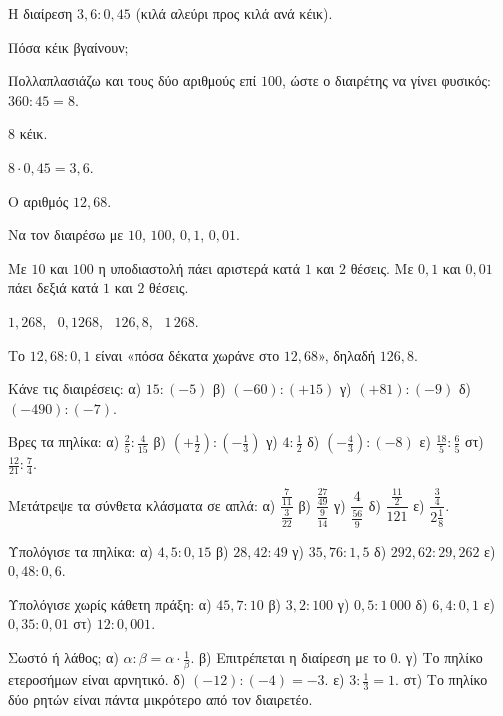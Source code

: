 \tixero Η διαίρεση $3{,}6:0{,}45$ (κιλά αλεύρι προς κιλά ανά κέικ).\par
\tithelo Πόσα κέικ βγαίνουν;\par
\possindeo Πολλαπλασιάζω και τους δύο αριθμούς επί $100$, ώστε ο διαιρέτης να γίνει φυσικός: $360:45=8$.\par
\apantisi $8$ κέικ.\par
\elegxos $8\cdot0{,}45=3{,}6$.

\tixero Ο αριθμός $12{,}68$.\par
\tithelo Να τον διαιρέσω με $10$, $100$, $0{,}1$, $0{,}01$.\par
\possindeo Με $10$ και $100$ η υποδιαστολή πάει αριστερά κατά $1$ και $2$ θέσεις. Με $0{,}1$ και $0{,}01$ πάει δεξιά κατά $1$ και $2$ θέσεις.\par
\apantisi $1{,}268$, \ $0{,}1268$, \ $126{,}8$, \ $1\,268$.\par
\elegxos Το $12{,}68:0{,}1$ είναι «πόσα δέκατα χωράνε στο $12{,}68$», δηλαδή $126{,}8$.



\ex Κάνε τις διαιρέσεις: α) $15:(-5)$ \quad β) $(-60):(+15)$ \quad γ) $(+81):(-9)$ \quad δ) $(-490):(-7)$.

\ex Βρες τα πηλίκα: α) $\frac{2}{5}:\frac{4}{15}$ \quad β) $\left(+\frac{1}{2}\right):\left(-\frac{1}{3}\right)$ \quad γ) $4:\frac{1}{2}$ \quad δ) $\left(-\frac{4}{3}\right):(-8)$ \quad ε) $\frac{18}{5}:\frac{6}{5}$ \quad στ) $\frac{12}{21}:\frac{7}{4}$.

\ex Μετάτρεψε τα σύνθετα κλάσματα σε απλά: α) $\dfrac{\frac{7}{11}}{\frac{3}{22}}$ \quad β) $\dfrac{\frac{27}{49}}{\frac{9}{14}}$ \quad γ) $\dfrac{4}{\frac{56}{9}}$ \quad δ) $\dfrac{\frac{11}{2}}{121}$ \quad ε) $\dfrac{\frac{3}{4}}{2\frac{1}{8}}$.

\ex Υπολόγισε τα πηλίκα: α) $4{,}5:0{,}15$ \quad β) $28{,}42:49$ \quad γ) $35{,}76:1{,}5$ \quad δ) $292{,}62:29{,}262$ \quad ε) $0{,}48:0{,}6$.

\ex Υπολόγισε χωρίς κάθετη πράξη: α) $45{,}7:10$ \quad β) $3{,}2:100$ \quad γ) $0{,}5:1\,000$ \quad δ) $6{,}4:0{,}1$ \quad ε) $0{,}35:0{,}01$ \quad στ) $12:0{,}001$.

\ex Σωστό ή λάθος; α) $\alpha:\beta=\alpha\cdot\frac{1}{\beta}$. \quad β) Επιτρέπεται η διαίρεση με το $0$. \quad γ) Το πηλίκο ετεροσήμων είναι αρνητικό. \quad δ) $(-12):(-4)=-3$. \quad ε) $3:\frac{1}{3}=1$. \quad στ) Το πηλίκο δύο ρητών είναι πάντα μικρότερο από τον διαιρετέο.

